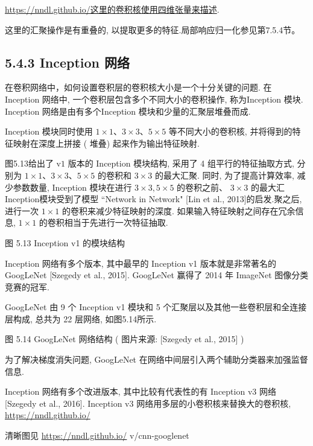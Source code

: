 \documentclass[10pt]{article}
\begin{document}
\href{https://nndl.github.io/%E8%BF%99%E9%87%8C%E7%9A%84%E5%8D%B7%E7%A7%AF%E6%A0%B8%E4%BD%BF%E7%94%A8%E5%9B%9B%E7%BB%B4%E5%BC%A0%E9%87%8F%E6%9D%A5%E6%8F%8F%E8%BF%B0}{https://nndl.github.io/这里的卷积核使用四维张量来描述}.

这里的汇聚操作是有重叠的, 以提取更多的特征.局部响应归一化参见第7.5.4节。

\subsection*{5.4.3 Inception 网络}
在卷积网络中，如何设置卷积层的卷积核大小是一个十分关键的问题. 在 Inception 网络中, 一个卷积层包含多个不同大小的卷积操作, 称为Inception 模块. Inception 网络是由有多个Inception 模块和少量的汇聚层堆叠而成.

Inception 模块同时使用 $1 \times 1 、 3 \times 3 、 5 \times 5$ 等不同大小的卷积核, 并将得到的特征映射在深度上拼接 ( 堆叠) 起来作为输出特征映射.

图5.13给出了 $\mathrm{v} 1$ 版本的 Inception 模块结构, 采用了 4 组平行的特征抽取方式, 分别为 $1 \times 1 、 3 \times 3 、 5 \times 5$ 的卷积和 $3 \times 3$ 的最大汇聚. 同时, 为了提高计算效率, 减少参数数量, Inception 模块在进行 $3 \times 3,5 \times 5$ 的卷积之前、 $3 \times 3$ 的最大汇 Inception模块受到了模型 “Network in Network" [Lin et al., 2013]的启发.聚之后, 进行一次 $1 \times 1$ 的卷积来减少特征映射的深度. 如果输入特征映射之间存在冗余信息, $1 \times 1$ 的卷积相当于先进行一次特征抽取.



图 5.13 Inception v1 的模块结构

Inception 网络有多个版本, 其中最早的 Inception v1 版本就是非常著名的 GoogLeNet [Szegedy et al., 2015]. GoogLeNet 赢得了 2014 年 ImageNet 图像分类竞赛的冠军.

GoogLeNet 由 9 个 Inception v1 模块和 5 个汇聚层以及其他一些卷积层和全连接层构成, 总共为 22 层网络, 如图5.14所示.



图 5.14 GoogLeNet 网络结构 ( 图片来源: [Szegedy et al., 2015] )

为了解决梯度消失问题, GoogLeNet 在网络中间层引入两个辅助分类器来加强监督信息.

Inception 网络有多个改进版本, 其中比较有代表性的有 Inception v3 网络 [Szegedy et al., 2016]. Inception v3 网络用多层的小卷积核来替换大的卷积核, \href{https://nndl.github.io/}{https://nndl.github.io/}

清晰图见 \href{https://nndl.github.io/}{https://nndl.github.io/} v/cnn-googlenet
\end{document}

